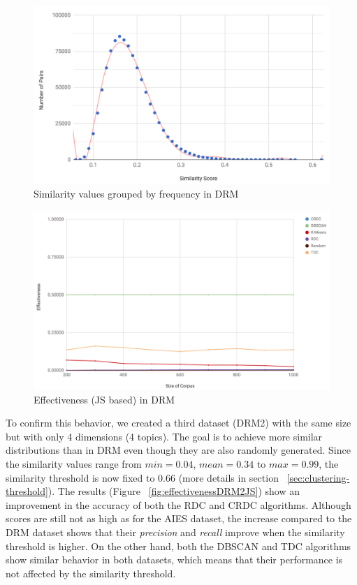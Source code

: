\begin{figure}
  \includegraphics[scale=0.30]{similaritiesDRM.png}
  \caption{Similarity values grouped by frequency in DRM}
  \label{fig:similaritiesDRM}
\end{figure}

\begin{figure}
  \includegraphics[scale=0.27]{effectivenessDRMJS.png}
  \caption{Effectiveness (JS based) in DRM}
  \label{fig:effectivenessDRMJS}
\end{figure}


To confirm this behavior, we created a third dataset (DRM2) with the same size but with only 4 dimensions (4 topics). The goal is to achieve more similar distributions than in DRM even though they are also randomly generated. Since the similarity values range from $min=0.04$, $mean=0.34$ to $max=0.99$, the similarity threshold is now fixed to 0.66 (more details in section ~\ref{sec:clustering-threshold}). The results (Figure ~\ref{fig:effectivenessDRM2JS}) show an improvement in the accuracy of both the RDC and CRDC algorithms. Although scores are still not as high as for the AIES dataset, the increase compared to the DRM dataset shows that their \textit{precision} and \textit{recall} improve when the similarity threshold is higher. On the other hand, both the DBSCAN and TDC algorithms show similar behavior in both datasets, which means that their performance is not affected by the similarity threshold.

